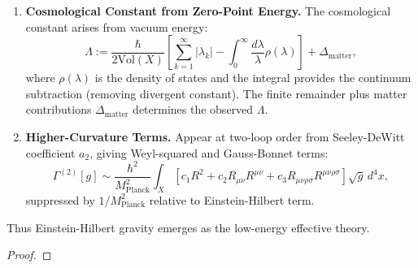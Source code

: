\begin{theorem}
\begin{enumerate}
\item \textbf{Cosmological Constant from Zero-Point Energy.} The cosmological constant arises from vacuum energy:
\begin{equation}
\Lambda := \frac{\hbar}{2 \text{Vol}(X)} \left[\sum_{k=1}^\infty |\lambda_k| - \int_0^\infty \frac{d\lambda}{\lambda} \rho(\lambda)\right] + \Delta_{\text{matter}},
\end{equation}
where $\rho(\lambda)$ is the density of states and the integral provides the continuum subtraction (removing divergent constant). The finite remainder plus matter contributions $\Delta_{\text{matter}}$ determines the observed $\Lambda$.

\item \textbf{Higher-Curvature Terms.} Appear at two-loop order from Seeley-DeWitt coefficient $a_2$, giving Weyl-squared and Gauss-Bonnet terms:
\begin{equation}
\Gamma^{(2)}[g] \sim \frac{\hbar^2}{M_{\text{Planck}}^2} \int_X [c_1 R^2 + c_2 R_{\mu\nu}R^{\mu\nu} + c_3 R_{\mu\nu\rho\sigma}R^{\mu\nu\rho\sigma}] \sqrt{g} \, d^4x,
\end{equation}
suppressed by $1/M_{\text{Planck}}^2$ relative to Einstein-Hilbert term.
\end{enumerate}

Thus Einstein-Hilbert gravity emerges as the low-energy effective theory.

\begin{proof}

\end{proof}
\end{theorem}

